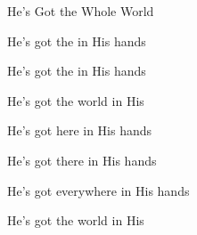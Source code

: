 \begin{SBSong}{He's Got the Whole World}
\begin{SBVerse}
    He's got the  in His hands

    He's got the  in His hands

    He's got the  world in His 
  \end{SBVerse}
  \begin{SBVerse}
    He's got  here in His hands

    He's got  there in His hands

    He's got  everywhere in His hands

    He's got the  world in His 
  \end{SBVerse}
\end{SBSong}
    
